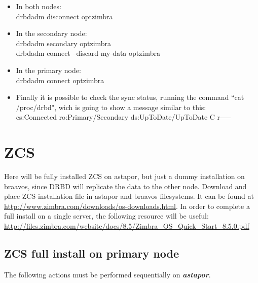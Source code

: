 \documentclass[a4paper, 12pt]{book}
\begin{document}
\begin{itemize}
	\item In both nodes:\\
		drbdadm disconnect optzimbra
	
	\item In the secondary node:\\
		drbdadm secondary optzimbra\\
		drbdadm connect --discard-my-data optzimbra
	
	\item In the primary node:\\
		drbdadm connect optzimbra
	
	\item Finally it is possible to check the sync status, running the command ``cat /proc/drbd", wich is going to show a message similar to this:\\
		cs:Connected ro:Primary/Secondary ds:UpToDate/UpToDate C r-----

\end{itemize}


\section{ZCS}
\label{sec:zcs}

Here will be fully installed ZCS on astapor, but just a dummy installation on braavos, since DRBD will replicate the data to the other node. Download and place ZCS installation file in astapor and braavos filesystems. It can be found at \url{http://www.zimbra.com/downloads/os-downloads.html}. In order to complete a full install on a single server, the following resource will be useful:\\
\url{http://files.zimbra.com/website/docs/8.5/Zimbra_OS_Quick_Start_8.5.0.pdf}


\subsection{ZCS full install on primary node}
\label{sec:fullinstall}

The following actions must be performed sequentially on \textit{\textbf{astapor}}.
\end{document}
